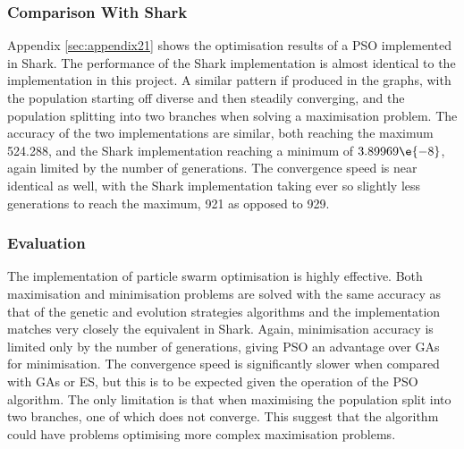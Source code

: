 \subsubsection{Comparison With Shark}
Appendix \ref{sec:appendix21} shows the optimisation results of a PSO implemented in Shark. The performance of the Shark implementation is almost identical to the implementation in this project. A similar pattern if produced in the graphs, with the population starting off diverse and then steadily converging, and the population splitting into two branches when solving a maximisation problem. The accuracy of the two implementations are similar, both reaching the maximum 524.288, and the Shark implementation reaching a minimum of $3.89969\e{-8}$, again limited by the number of generations. The convergence speed is near identical as well, with the Shark implementation taking ever so slightly less generations to reach the maximum, 921 as opposed to 929.

\subsubsection{Evaluation}
The implementation of particle swarm optimisation is highly effective. Both maximisation and minimisation problems are solved with the same accuracy as that of the genetic and evolution strategies algorithms and the implementation matches very closely the equivalent in Shark. Again, minimisation accuracy is limited only by the number of generations, giving PSO an advantage over GAs for minimisation. The convergence speed is significantly slower when compared with GAs or ES, but this is to be expected given the operation of the PSO algorithm. The only limitation is that when maximising the population split into two branches, one of which does not converge. This suggest that the algorithm could have problems optimising more complex maximisation problems.

